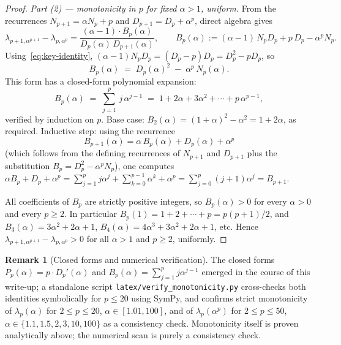 \documentclass[11pt,a4paper]{article}
\theoremstyle{definition}
\newtheorem{remark}{Remark}[section]
\begin{document}
\begin{proof}
\medskip

\noindent\emph{Part (2) --- monotonicity in $p$ for fixed $\alpha > 1$, uniform.} From the recurrences $N_{p+1} = \alpha N_p + p$ and $D_{p+1} = D_p + \alpha^p$, direct algebra gives
\[
  \lambda_{p+1,\alpha^{p+1}} - \lambda_{p,\alpha^p}
  = \frac{(\alpha-1)\cdot B_p(\alpha)}{D_p(\alpha)\,D_{p+1}(\alpha)},
  \qquad
  B_p(\alpha) := (\alpha-1)\, N_p D_p + p\, D_p - \alpha^p N_p.
\]
Using~\eqref{eq:key-identity}, $(\alpha-1) N_p D_p = (D_p - p) D_p = D_p^2 - p D_p$, so
\[
  B_p(\alpha) \;=\; D_p(\alpha)^2 \;-\; \alpha^p\, N_p(\alpha).
\]
This form has a closed-form polynomial expansion:
\begin{equation}\label{eq:Bp-closed}
  B_p(\alpha) \;=\; \sum_{j=1}^{p}\, j\, \alpha^{j-1}
  \;=\; 1 + 2\alpha + 3\alpha^2 + \cdots + p\, \alpha^{p-1},
\end{equation}
verified by induction on $p$. Base case: $B_2(\alpha) = (1+\alpha)^2 - \alpha^2 = 1 + 2\alpha$, as required. Inductive step: using the recurrence
\[
  B_{p+1}(\alpha) = \alpha\, B_p(\alpha) + D_p(\alpha) + \alpha^p
\]
(which follows from the defining recurrences of $N_{p+1}$ and $D_{p+1}$ plus the substitution $B_p = D_p^2 - \alpha^p N_p$), one computes $\alpha B_p + D_p + \alpha^p = \sum_{j=1}^{p} j\alpha^j + \sum_{k=0}^{p-1}\alpha^k + \alpha^p = \sum_{j=0}^{p} (j+1)\alpha^j = B_{p+1}$.

All coefficients of $B_p$ are strictly positive integers, so $B_p(\alpha) > 0$ for every $\alpha > 0$ and every $p \geq 2$. In particular $B_p(1) = 1 + 2 + \cdots + p = p(p+1)/2$, and $B_3(\alpha) = 3\alpha^2 + 2\alpha + 1$, $B_4(\alpha) = 4\alpha^3 + 3\alpha^2 + 2\alpha + 1$, etc. Hence $\lambda_{p+1,\alpha^{p+1}} - \lambda_{p,\alpha^p} > 0$ for all $\alpha > 1$ and $p \geq 2$, uniformly.
\end{proof}

\begin{remark}[Closed forms and numerical verification]
The closed forms $P_p(\alpha) = p \cdot D_p'(\alpha)$ and $B_p(\alpha) = \sum_{j=1}^p j\alpha^{j-1}$ emerged in the course of this write-up; a standalone script \texttt{latex/verify\_monotonicity.py} cross-checks both identities symbolically for $p \leq 20$ using SymPy, and confirms strict monotonicity of $\lambda_p(\alpha)$ for $2 \leq p \leq 20$, $\alpha \in [1.01, 100]$, and of $\lambda_p(\alpha^p)$ for $2 \leq p \leq 50$, $\alpha \in \{1.1, 1.5, 2, 3, 10, 100\}$ as a consistency check. Monotonicity itself is proven analytically above; the numerical scan is purely a consistency check.
\end{remark}
\end{document}
